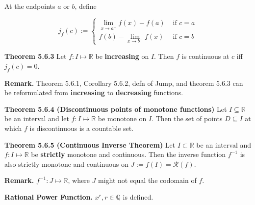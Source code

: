 \documentclass[10pt,landscape]{article}
\begin{document}
\begin{multicols}{4}
At the endpoints $a$ or $b$, define

$$
j_{f}(c):=\left\{\begin{array}{ll}
\underset{x \rightarrow a^{+}}{\lim} f(x)-f(a) & \text { if } c=a \\
f(b)-\underset{x \rightarrow b^{-}}{\lim} f(x) & \text { if } c=b
\end{array}\right.
$$

\textbf{Theorem 5.6.3} Let $f : I \mapsto \mathbb{R}$ be \textbf{increasing} on $I$. Then $f$ is continuous at $c$ iff $j_f(c) = 0$.

\textbf{Remark.} Theorem 5.6.1, Corollary 5.6.2, defn of Jump, and theorem 5.6.3 can be reformulated from \textbf{increasing} to \textbf{decreasing} functions.

\textbf{Theorem 5.6.4 (Discontinuous points of monotone functions)} Let $I \subseteq \mathbb{R}$ be an interval and let $f: I \mapsto \mathbb{R}$ be monotone on $I$. Then the set of points $D \subseteq I$ at which $f$ is discontinuous is a countable set.


\textbf{Theorem 5.6.5 (Continuous Inverse Theorem)} Let $I \subset \mathbb{R}$ be an interval and $f : I \mapsto \mathbb{R}$ be \textbf{strictly} monotone and continuous. Then the inverse function $f^{-1}$ is also strictly monotone and continuous on $J := f(I) = \mathcal{R}(f)$.

\textbf{Remark.} $f^{-1}: J \mapsto \mathbb{R}$, where $J$ might not equal the codomain of $f$.

\textbf{Rational Power Function.} $x^r, r \in \mathbb{Q}$ is defined.


\end{multicols}
\end{document}
